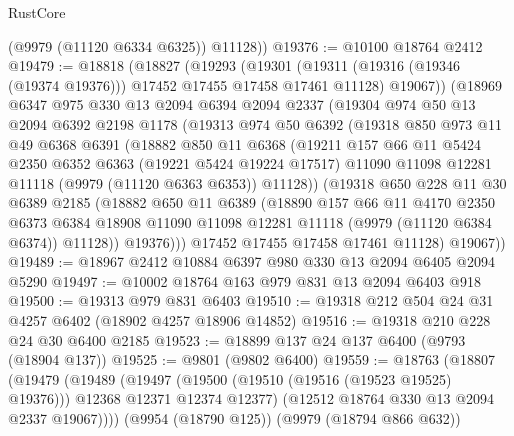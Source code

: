 \begin{lexlean}{RustCore}
\begin{coremodule}
        (@9979 (@11120 @6334 @6325))
        @11128))
@19376 := @10100 @18764 @2412
@19479 := @18818
    (@18827
      (@19293
        (@19301
          (@19311 (@19316 (@19346 (@19374 @19376))) @17452 @17455 @17458 @17461 @11128)
          @19067))
      (@18969
        @6347
        @975
        @330
        @13
        @2094
        @6394
        @2094
        @2337
        (@19304
          @974
          @50
          @13
          @2094
          @6392
          @2198
          @1178
          (@19313
            @974
            @50
            @6392
            (@19318
              @850
              @973
              @11
              @49
              @6368
              @6391
              (@18882
                @850
                @11
                @6368
                (@19211
                  @157
                  @66
                  @11
                  @5424
                  @2350
                  @6352
                  @6363
                  (@19221 @5424 @19224 @17517)
                  @11090
                  @11098
                  @12281
                  @11118
                  (@9979 (@11120 @6363 @6353))
                  @11128))
              (@19318
                @650
                @228
                @11
                @30
                @6389
                @2185
                (@18882
                  @650
                  @11
                  @6389
                  (@18890
                    @157
                    @66
                    @11
                    @4170
                    @2350
                    @6373
                    @6384
                    @18908
                    @11090
                    @11098
                    @12281
                    @11118
                    (@9979 (@11120 @6384 @6374))
                    @11128))
                @19376)))
          @17452
          @17455
          @17458
          @17461
          @11128)
        @19067))
@19489 := @18967 @2412 @10884 @6397 @980 @330 @13 @2094 @6405 @2094 @5290
@19497 := @10002 @18764 @163 @979 @831 @13 @2094 @6403 @918
@19500 := @19313 @979 @831 @6403
@19510 := @19318 @212 @504 @24 @31 @4257 @6402 (@18902 @4257 @18906 @14852)
@19516 := @19318 @210 @228 @24 @30 @6400 @2185
@19523 := @18899 @137 @24 @137 @6400 (@9793 (@18904 @137))
@19525 := @9801 (@9802 @6400)
@19559 := @18763
    (@18807
      (@19479
        (@19489
          (@19497 (@19500 (@19510 (@19516 (@19523 @19525) @19376))) @12368 @12371 @12374 @12377)
          (@12512 @18764 @330 @13 @2094 @2337 @19067))))
    (@9954 (@18790 @125))
    (@9979 (@18794 @866 @632))

\end{coremodule}
\end{lexlean}
